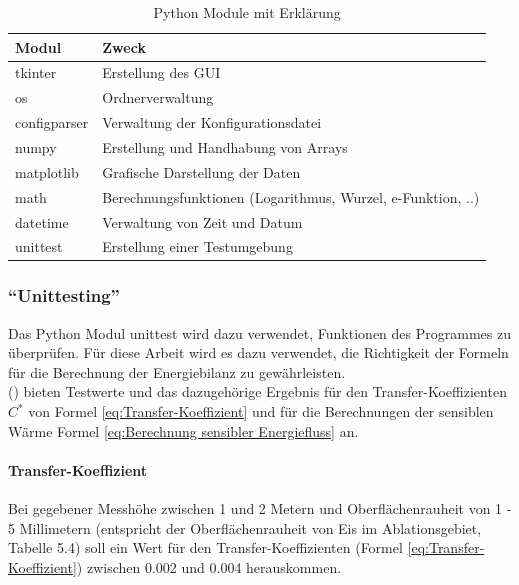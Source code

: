 \documentclass[11pt,a4paper]{article}
\begin{document}
\begin{table}[H]
\centering
{} 
\caption{Python Module mit Erklärung}
\label{tab:Python Module}
\begin{tabular}{|l|l|}
\hline
\textbf{Modul} & \textbf{Zweck}                                \\ \hline
tkinter             & Erstellung des GUI         \\
os             & Ordnerverwaltung         \\
configparser             & Verwaltung der Konfigurationsdatei         \\
numpy          & Erstellung und Handhabung von Arrays          \\
matplotlib     & Grafische Darstellung der Daten               \\
math		   & Berechnungsfunktionen (Logarithmus, Wurzel, e-Funktion, ..)   \\  
datetime		   & Verwaltung von Zeit und Datum   \\
unittest		   & Erstellung einer Testumgebung   \\  \hline


\end{tabular}
\end{table}
\vspace{0.3cm}

\subsubsection{``Unittesting''}
Das Python Modul unittest wird dazu verwendet, Funktionen des Programmes zu überprüfen. Für diese Arbeit wird es dazu verwendet, die Richtigkeit der Formeln für die Berechnung der Energiebilanz zu gewährleisten.\\

\citeauthor{ThePhysicsOfGlaciers} (\citeyear[157]{ThePhysicsOfGlaciers}) bieten Testwerte und das dazugehörige Ergebnis für den Transfer-Koeffizienten $C^*$ von Formel \ref{eq:Transfer-Koeffizient} und für die Berechnungen der sensiblen Wärme Formel \ref{eq:Berechnung sensibler Energiefluss} an.


\paragraph{Transfer-Koeffizient}

Bei gegebener Messhöhe zwischen 1 und 2 Metern und Oberflächenrauheit von  1 - 5 Millimetern (entspricht der Oberflächenrauheit von Eis im Ablationsgebiet, Tabelle 5.4) soll ein Wert für den Transfer-Koeffizienten (Formel \ref{eq:Transfer-Koeffizient}) zwischen 0.002 und 0.004 herauskommen.\\
\end{document}
